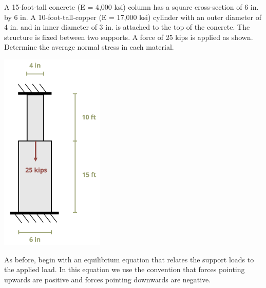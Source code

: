 \documentclass[
  letterpaper,
  DIV=11,
  numbers=noendperiod]{scrreprt}
\theoremstyle{definition}
\theoremstyle{remark}
\begin{document}
\begin{tcolorbox}[enhanced jigsaw, leftrule=.75mm, colbacktitle=quarto-callout-tip-color!10!white, breakable, opacityback=0, colback=white, titlerule=0mm, toprule=.15mm, colframe=quarto-callout-tip-color-frame, coltitle=black, title={Example 5.6}, toptitle=1mm, bottomrule=.15mm, rightrule=.15mm, left=2mm, arc=.35mm, opacitybacktitle=0.6, bottomtitle=1mm]

A 15-foot-tall concrete (E = 4,000 ksi) column has a square
cross-section of 6 in. by 6 in. A 10-foot-tall-copper (E = 17,000 ksi)
cylinder with an outer diameter of 4 in. and in inner diameter of 3 in.
is attached to the top of the concrete. The structure is fixed between
two supports. A force of 25 kips is applied as shown. Determine the
average normal stress in each material.

\begin{center}
\includegraphics[width=1.94792in,height=\textheight]{images/PNGs/Example 5.6 part 1.png}
\end{center}

\begin{tcolorbox}[enhanced jigsaw, leftrule=.75mm, colbacktitle=quarto-callout-tip-color!10!white, breakable, opacityback=0, colback=white, titlerule=0mm, toprule=.15mm, colframe=quarto-callout-tip-color-frame, coltitle=black, title={Solution}, toptitle=1mm, bottomrule=.15mm, rightrule=.15mm, left=2mm, arc=.35mm, opacitybacktitle=0.6, bottomtitle=1mm]

As before, begin with an equilibrium equation that relates the support
loads to the applied load. In this equation we use the convention that
forces pointing upwards are positive and forces pointing downwards are
negative.


\end{tcolorbox}
\end{tcolorbox}
\end{document}
